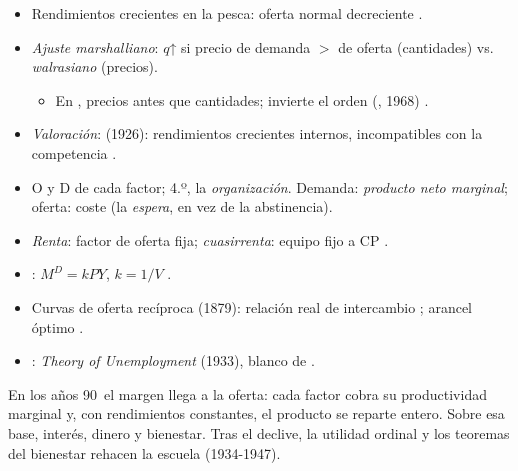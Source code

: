 \documentclass{article}
\begin{document}
\begin{columnas}
\begin{itemize}
\begin{itemize}
  \end{itemize}
\end{itemize}
\begin{itemize}
\item Rendimientos crecientes en la pesca: oferta normal decreciente .
\item \emph{Ajuste marshalliano}: $q$↑ si precio de demanda $>$ de oferta (cantidades) vs. \emph{walrasiano} (precios).
  \begin{itemize}
  \item En , precios antes que cantidades;  invierte el orden (, 1968) .
  \end{itemize}
\item \emph{Valoración}:  (1926): rendimientos crecientes internos, incompatibles con la competencia .
\end{itemize}
\begin{itemize}
\item O y D de cada factor; 4.º, la \emph{organización}. Demanda: \emph{producto neto marginal}; oferta: coste (la \emph{espera}, en vez de la abstinencia).
\item \emph{Renta}: factor de oferta fija; \emph{cuasirrenta}: equipo fijo a CP .
\item {}: $M^D=kPY$, $k=1/V$ .
\item Curvas de oferta recíproca (1879): relación real de intercambio ; arancel óptimo .
\item {}: \emph{Theory of Unemployment} (1933), blanco de  .
\end{itemize}

\begin{ideaclave}
En los años 90~el margen llega a la oferta: cada factor cobra su productividad marginal y, con rendimientos constantes, el producto se reparte entero. Sobre esa base, interés, dinero y bienestar. Tras el declive, la utilidad ordinal y los teoremas del bienestar rehacen la escuela (1934-1947).
\end{ideaclave}


\end{columnas}
\end{document}
